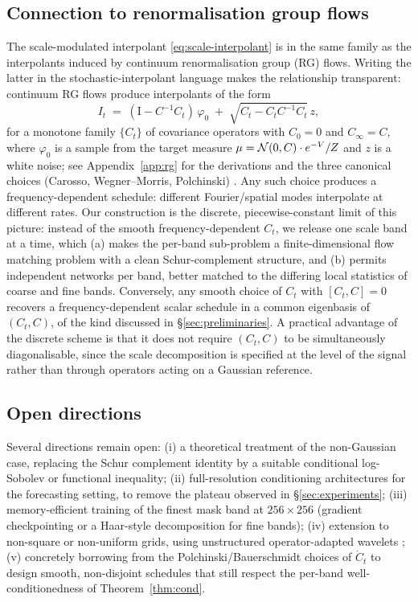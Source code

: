 \documentclass[11pt]{amsart}
\theoremstyle{remark}
\numberwithin{equation}{section}
\begin{document}
\subsection{Connection to renormalisation group flows}
\label{sec:rg}
The scale-modulated interpolant \eqref{eq:scale-interpolant} is in the same family as the interpolants induced by continuum renormalisation group (RG) flows. Writing the latter in the stochastic-interpolant language makes the relationship transparent: continuum RG flows produce interpolants of the form
\begin{equation}
\label{eq:rg-interpolant}
 I_t \;=\; (\mathrm{I}-C^{-1}C_t)\,\varphi_0 \;+\; \sqrt{C_t - C_t C^{-1}C_t}\,z,
\end{equation}
for a monotone family $\{C_t\}$ of covariance operators with $C_0=0$ and $C_\infty=C$, where $\varphi_0$ is a sample from the target measure $\mu=\mathcal{N}(0,C)\cdot e^{-V}/Z$ and $z$ is a white noise; see Appendix~\ref{app:rg} for the derivations and the three canonical choices (Carosso, Wegner--Morris, Polchinski) \cite{cotler2023renormalization,cotler2023renormalizing,bauerschmidt2023stochastic}. Any such choice produces a frequency-dependent schedule: different Fourier/spatial modes interpolate at different rates. Our construction is the discrete, piecewise-constant limit of this picture: instead of the smooth frequency-dependent $C_t$, we release one scale band at a time, which (a) makes the per-band sub-problem a finite-dimensional flow matching problem with a clean Schur-complement structure, and (b) permits independent networks per band, better matched to the differing local statistics of coarse and fine bands. Conversely, any smooth choice of $C_t$ with $[C_t,C]=0$ recovers a frequency-dependent scalar schedule in a common eigenbasis of $(C_t,C)$, of the kind discussed in \S\ref{sec:preliminaries}. A practical advantage of the discrete scheme is that it does not require $(C_t,C)$ to be simultaneously diagonalisable, since the scale decomposition is specified at the level of the signal rather than through operators acting on a Gaussian reference.

\subsection{Open directions}
Several directions remain open: (i) a theoretical treatment of the non-Gaussian case, replacing the Schur complement identity by a suitable conditional log-Sobolev or functional inequality; (ii) full-resolution conditioning architectures for the forecasting setting, to remove the plateau observed in \S\ref{sec:experiments}; (iii) memory-efficient training of the finest mask band at $256\times 256$ (gradient checkpointing or a Haar-style decomposition for fine bands); (iv) extension to non-square or non-uniform grids, using unstructured operator-adapted wavelets \cite{owhadi2019operator}; (v) concretely borrowing from the Polchinski/Bauerschmidt \cite{bauerschmidt2023stochastic} choices of $\dot C_t$ to design smooth, non-disjoint schedules that still respect the per-band well-conditionedness of Theorem~\ref{thm:cond}.
\end{document}
